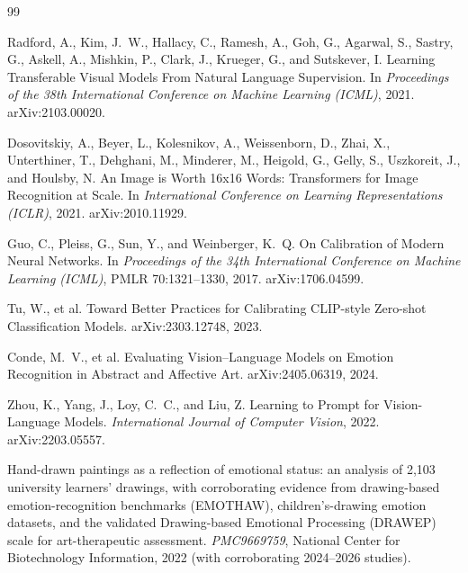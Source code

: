 \documentclass[10pt,twocolumn,letterpaper]{article}
\begin{document}
\balance

\begin{thebibliography}{99}

Radford, A., Kim, J.~W., Hallacy, C., Ramesh, A., Goh, G., Agarwal, S., Sastry, G., Askell, A., Mishkin, P., Clark, J., Krueger, G., and Sutskever, I.
\newblock Learning Transferable Visual Models From Natural Language Supervision.
\newblock In \emph{Proceedings of the 38th International Conference on Machine Learning (ICML)}, 2021.
\newblock arXiv:2103.00020.

Dosovitskiy, A., Beyer, L., Kolesnikov, A., Weissenborn, D., Zhai, X., Unterthiner, T., Dehghani, M., Minderer, M., Heigold, G., Gelly, S., Uszkoreit, J., and Houlsby, N.
\newblock An Image is Worth 16x16 Words: Transformers for Image Recognition at Scale.
\newblock In \emph{International Conference on Learning Representations (ICLR)}, 2021.
\newblock arXiv:2010.11929.

Guo, C., Pleiss, G., Sun, Y., and Weinberger, K.~Q.
\newblock On Calibration of Modern Neural Networks.
\newblock In \emph{Proceedings of the 34th International Conference on Machine Learning (ICML)}, PMLR 70:1321--1330, 2017.
\newblock arXiv:1706.04599.

Tu, W., et al.
\newblock Toward Better Practices for Calibrating CLIP-style Zero-shot Classification Models.
\newblock arXiv:2303.12748, 2023.

Conde, M.~V., et al.
\newblock Evaluating Vision--Language Models on Emotion Recognition in Abstract and Affective Art.
\newblock arXiv:2405.06319, 2024.

Zhou, K., Yang, J., Loy, C.~C., and Liu, Z.
\newblock Learning to Prompt for Vision-Language Models.
\newblock \emph{International Journal of Computer Vision}, 2022.
\newblock arXiv:2203.05557.

Hand-drawn paintings as a reflection of emotional status: an analysis of 2{,}103 university learners' drawings, with corroborating evidence from drawing-based emotion-recognition benchmarks (EMOTHAW), children's-drawing emotion datasets, and the validated Drawing-based Emotional Processing (DRAWEP) scale for art-therapeutic assessment.
\newblock \emph{PMC9669759}, National Center for Biotechnology Information, 2022 (with corroborating 2024--2026 studies).


\end{thebibliography}
\end{document}
